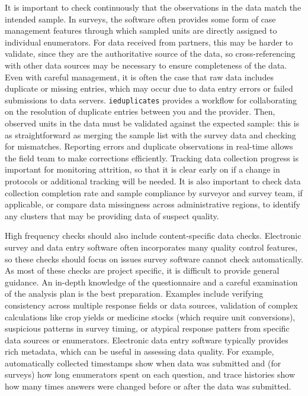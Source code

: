 \begin{fullwidth}
It is important to check continuously that the observations in the data match the intended sample.
In surveys, the software often provides some form of case management features
through which sampled units are directly assigned to individual enumerators.
For data received from partners, this may be harder to validate,
since they are the authoritative source of the data,
so cross-referencing with other data sources may be necessary to ensure completeness of the data.
Even with careful management, it is often the case that raw data includes duplicate or missing entries,
which may occur due to data entry errors or failed submissions to data servers.
\texttt{ieduplicates}
provides a workflow for collaborating on the resolution of duplicate entries between you and the provider.
Then, observed units in the data must be validated against the expected sample:
this is as straightforward as merging the sample list with the survey data and checking for mismatches.
Reporting errors and duplicate observations in real-time allows the field team to make corrections efficiently.
Tracking data collection progress is important for monitoring attrition,
so that it is clear early on if a change in protocols or additional tracking will be needed.
It is also important to check data collection completion rate
and sample compliance by surveyor and survey team, if applicable,
or compare data missingness across administrative regions,
to identify any clusters that may be providing data of suspect quality.

High frequency checks should also include content-specific data checks.
Electronic survey and data entry software often incorporates many quality control features,
so these checks should focus on issues survey software cannot check automatically.
As most of these checks are project specific,
it is difficult to provide general guidance.
An in-depth knowledge of the questionnaire and a careful examination of the analysis plan
is the best preparation.
Examples include verifying consistency across multiple response fields or data sources,
validation of complex calculations like crop yields or medicine stocks (which require unit conversions),
suspicious patterns in survey timing,
or atypical response patters from specific data sources or enumerators.
Electronic data entry software typically provides rich metadata,
which can be useful in assessing data quality.
For example, automatically collected timestamps show when data was submitted
and (for surveys) how long enumerators spent on each question,
and trace histories show how many
times answers were changed before or after the data was submitted.


\end{fullwidth}
